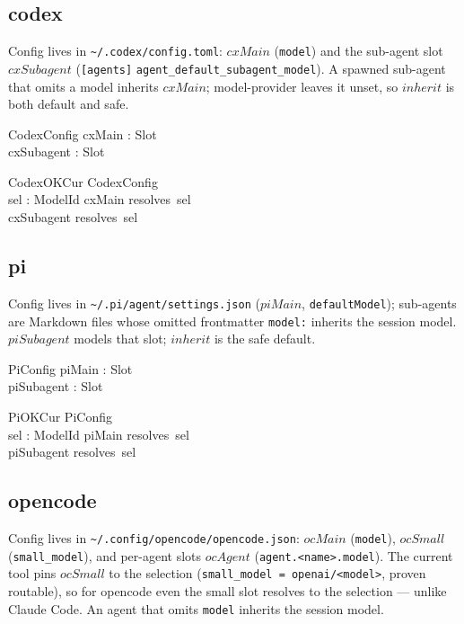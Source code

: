 \documentclass{article}
\begin{document}
\subsection{codex}

Config lives in \texttt{\~{}/.codex/config.toml}: $cxMain$ (\texttt{model}) and
the sub-agent slot $cxSubagent$ (\texttt{[agents]}
\texttt{agent\_default\_subagent\_model}). A spawned sub-agent that omits a
model inherits $cxMain$; model-provider leaves it unset, so $inherit$ is both
default and safe.

\begin{schema}{CodexConfig}
  cxMain : Slot \\
  cxSubagent : Slot
\end{schema}

\begin{schema}{CodexOKCur}
  CodexConfig \\
  sel : ModelId
\where
  cxMain \in resolves~sel \\
  cxSubagent \in resolves~sel
\end{schema}

\subsection{pi}

Config lives in \texttt{\~{}/.pi/agent/settings.json} ($piMain$,
\texttt{defaultModel}); sub-agents are Markdown files whose omitted frontmatter
\texttt{model:} inherits the session model. $piSubagent$ models that slot;
$inherit$ is the safe default.

\begin{schema}{PiConfig}
  piMain : Slot \\
  piSubagent : Slot
\end{schema}

\begin{schema}{PiOKCur}
  PiConfig \\
  sel : ModelId
\where
  piMain \in resolves~sel \\
  piSubagent \in resolves~sel
\end{schema}

\subsection{opencode}

Config lives in \texttt{\~{}/.config/opencode/opencode.json}: $ocMain$
(\texttt{model}), $ocSmall$ (\texttt{small\_model}), and per-agent slots
$ocAgent$ (\texttt{agent.<name>.model}). The current tool pins $ocSmall$ to the
selection (\texttt{small\_model = openai/<model>}, proven routable), so for
opencode even the small slot resolves to the selection --- unlike Claude Code.
An agent that omits \texttt{model} inherits the session model.
\end{document}
